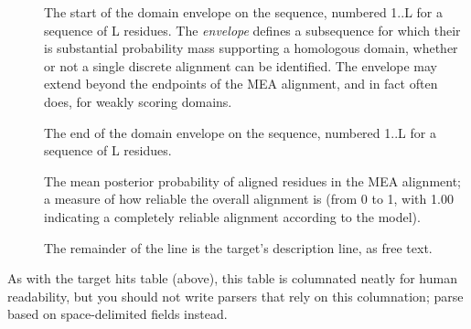 \begin{description}
\item[] The start of the domain
  envelope on the sequence, numbered 1..L for a sequence of L
  residues. The \emph{envelope} defines a subsequence for which their
  is substantial probability mass supporting a homologous domain, 
  whether or not a single discrete alignment can be identified. 
  The envelope may extend beyond the endpoints of the MEA alignment,
  and in fact often does, for weakly scoring domains.

\item[] The end of the domain
  envelope on the sequence, numbered 1..L for a sequence of L
  residues. 

\item[] The mean posterior probability of aligned
  residues in the MEA alignment; a measure of how reliable the overall
  alignment is (from 0 to 1, with 1.00 indicating a completely
  reliable alignment according to the model).

\item[] The remainder of the line
  is the target's description line, as free text.
\end{description}

As with the target hits table (above), this table is columnated neatly
for human readability, but you should not write parsers that rely on
this columnation; parse based on space-delimited fields instead.
